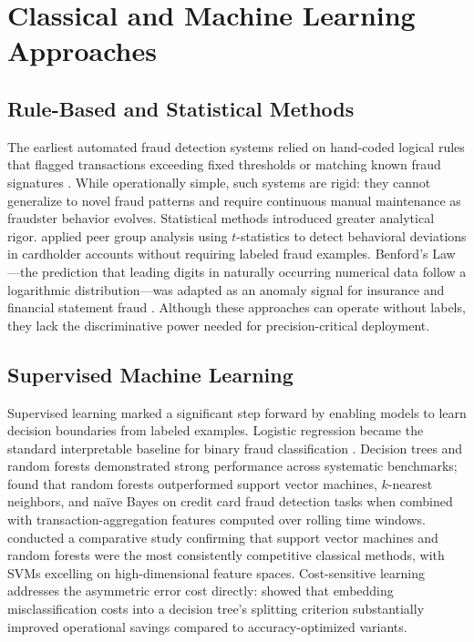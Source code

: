 \section{Classical and Machine Learning Approaches}

\subsection{Rule-Based and Statistical Methods}

The earliest automated fraud detection systems relied on hand-coded logical rules that
flagged transactions exceeding fixed thresholds or matching known fraud signatures
\cite{phua2010comprehensive}. While operationally simple, such systems are rigid:
they cannot generalize to novel fraud patterns and require continuous manual maintenance
as fraudster behavior evolves. Statistical methods introduced greater analytical rigor.
\cite{bolton2002statistical} applied peer group analysis using $t$-statistics to detect
behavioral deviations in cardholder accounts without requiring labeled fraud examples.
Benford's Law—the prediction that leading digits in naturally occurring numerical data
follow a logarithmic distribution—was adapted as an anomaly signal for insurance and
financial statement fraud \cite{maher2002benford, lu2005detecting}. Although these
approaches can operate without labels, they lack the discriminative power needed for
precision-critical deployment.

\subsection{Supervised Machine Learning}

Supervised learning marked a significant step forward by enabling models to learn
decision boundaries from labeled examples. Logistic regression became the standard
interpretable baseline for binary fraud classification \cite{ngai2011application}.
Decision trees and random forests demonstrated strong performance across systematic
benchmarks; \cite{whitrow2009transaction} found that random forests outperformed
support vector machines, $k$-nearest neighbors, and naïve Bayes on credit card fraud
detection tasks when combined with transaction-aggregation features computed over
rolling time windows. \cite{bhattacharyya2011data} conducted a comparative study
confirming that support vector machines and random forests were the most consistently
competitive classical methods, with SVMs excelling on high-dimensional feature spaces.
Cost-sensitive learning addresses the asymmetric error cost directly: \cite{sahin2013cost}
showed that embedding misclassification costs into a decision tree's splitting criterion
substantially improved operational savings compared to accuracy-optimized variants.

